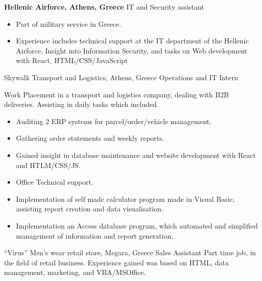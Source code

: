 {\textbf{Hellenic Airforce, Athens, Greece}}
{IT and Security assistant}
{
    \begin{itemize}
        \item Part of military service in Greece.
        \item Experience includes technical support at the IT department of the Hellenic Airforce, Insight into Information Security, and tasks on Web development with React, HTML/CSS/JavaScript
    \end{itemize}
}

{Skywalk Transport and Logistics, Athens, Greece }
{Operations and IT Intern}
{

    Work Placement in a transport and logistics company, dealing with B2B deliveries. Assisting in daily tasks which included.
    \begin{itemize}
        \item Auditing 2 ERP systems for parcel/order/vehicle management.
        \item Gathering order statements and weekly reports.
        \item Gained insight in database maintenance and website development with React and HTLM/CSS/JS.
        \item Office Technical support.
        \item Implementation of self made calculator program made in Visual Basic, assisting report creation and data visualisation.
        \item Implementation an Access database program, which automated and simplified management of information and report generation.

    \end{itemize}
}

{“Virus” Men’s wear retail store, Megara, Greece}
{Sales Assistant}
{
    Part time job, in the field of retail business. Experience gained was based on HTML, data management, marketing, and VBA/MSOffice.
}

